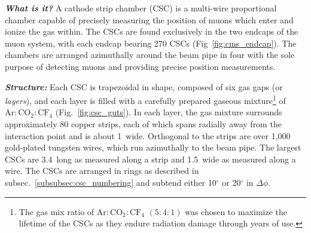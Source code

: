\textit{\textbf{What is it?}}
A cathode strip chamber (CSC) is a multi-wire proportional chamber capable of precisely measuring the position of muons which enter and ionize the gas within.
The CSCs are found exclusively in the two endcaps of the muon system, with each endcap bearing 270 CSCs (Fig~\ref{fig:cms_endcap}).
The chambers are arranged azimuthally around the beam pipe in four with the sole purpose of detecting muons and providing precise position measurements.

\textit{\textbf{Structure:}}
Each CSC is trapezoidal in shape, composed of six gas gaps (or \emph{layers}), and each layer is filled with a carefully prepared gaseous mixture\footnote{
    The gas mix ratio of $\mathrm{Ar:CO_{2}:CF_{4}}$ $(5:4:1)$ was chosen to maximize the lifetime of the CSCs as they endure radiation damage through years of use.
    }
of $\mathrm{Ar:CO_{2}:CF_{4}}$ (Fig.~\ref{fig:csc_guts}).
In each layer, the gas mixture surrounds approximately 80 copper strips, each of which spans radially away from the interaction point and is about 1~\cm wide.
Orthogonal to the strips
are over 1,000 gold-plated tungsten wires, which run azimuthally to the beam pipe.
The largest CSCs are 3.4~\meter long as measured along a strip and 1.5~\meter wide as measured along a wire.
The CSCs are arranged in rings as described in subsec.~\ref{subsubsec:csc_numbering} and subtend either 10$^\circ$ or 20$^\circ$ in $\Delta\phi$.
